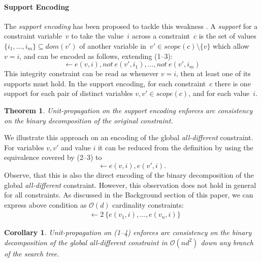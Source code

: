 \documentclass[letterpaper]{article}
\newtheorem{theorem}{Theorem}
\newtheorem{corollary}{Corollary}[theorem]
\newcommand{\dneg}{not\ }
\newcommand{\domain}[1]{dom(#1)}
\newcommand{\scope}[1]{scope(#1)}
\begin{document}
\paragraph{Support Encoding}
The \emph{support encoding} has been proposed to
tackle this weakness \cite{gent02}. A \emph{support} for a constraint variable~$v$ to take the value~$i$ across a constraint~$c$ is the set of values $\{i_1, \dots, i_m\} \subseteq \domain{v'}$ of another variable in~$v' \in \scope{c}\setminus \{v\}$ which allow $v = i$, and can be encoded as follows, extending (1--3):
\[
\leftarrow e(v, i), \dneg e(v', i_1), \dots, \dneg e(v', i_m)
\]
This integrity constraint can be read as whenever $v = i$, then at least one of its supports must hold.
In the support encoding, for each constraint~$c$ there is one support for each pair of distinct variables $v, v' \in \scope{c}$, and for each value~$i$.
\begin{theorem}
Unit-propagation on the support encoding enforces arc consistency on the binary decomposition of the original constraint.
\end{theorem}
We illustrate this approach on an encoding of the global \emph{all-different} constraint. For variables $v, v'$ and value $i$ it can be reduced from the definition by using the equivalence covered by (2--3) to
\[
\leftarrow e(v, i), e(v', i).
\]
Observe, that this is also
the direct encoding of the binary decomposition of the global \emph{all-different} constraint. However, this observation does not hold in general for all constraints.
As discussed in the Background section of this paper, we can express above condition as $\mathcal{O}(d)$ cardinality constraints:
\begin{align}
&\leftarrow 2\ \{ e(v_1, i), \dots, e(v_n, i) \}
\end{align}

\begin{corollary}
Unit-propagation on (1--4) enforces arc consistency on the binary decomposition of the global \emph{all-different} constraint in $\mathcal{O}(nd^2)$ down any branch of the search tree.
\end{corollary}
\end{document}
